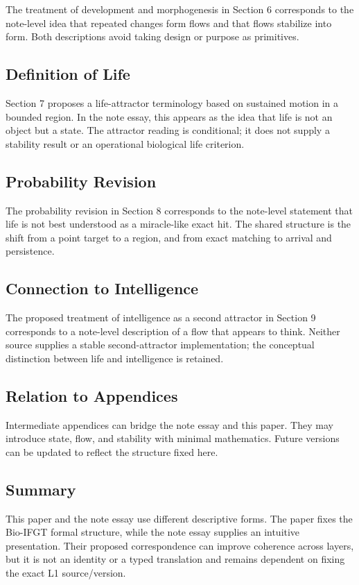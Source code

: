 The treatment of development and morphogenesis in Section 6 corresponds to the note-level idea that repeated changes form flows and that flows stabilize into form. Both descriptions avoid taking design or purpose as primitives.

\subsection{Definition of Life}

Section 7 proposes a life-attractor terminology based on sustained motion in a bounded region. In the note essay, this appears as the idea that life is not an object but a state. The attractor reading is conditional; it does not supply a stability result or an operational biological life criterion.

\subsection{Probability Revision}

The probability revision in Section 8 corresponds to the note-level statement that life is not best understood as a miracle-like exact hit. The shared structure is the shift from a point target to a region, and from exact matching to arrival and persistence.

\subsection{Connection to Intelligence}

The proposed treatment of intelligence as a second attractor in Section 9 corresponds to a note-level description of a flow that appears to think. Neither source supplies a stable second-attractor implementation; the conceptual distinction between life and intelligence is retained.

\subsection{Relation to Appendices}

Intermediate appendices can bridge the note essay and this paper. They may introduce state, flow, and stability with minimal mathematics. Future versions can be updated to reflect the structure fixed here.

\subsection{Summary}

This paper and the note essay use different descriptive forms. The paper fixes the Bio-IFGT formal structure, while the note essay supplies an intuitive presentation. Their proposed correspondence can improve coherence across layers, but it is not an identity or a typed translation and remains dependent on fixing the exact L1 source/version.
